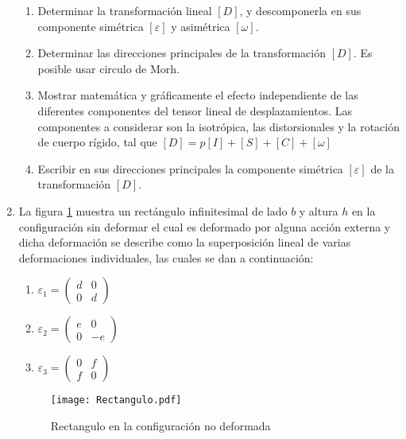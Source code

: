 \documentclass[../notas medios.tex]{subfiles}
\begin{document}
\begin{enumerate}
\begin{enumerate}
\item Determinar la transformación lineal $[D]$, y descomponerla en sus componente simétrica $[\varepsilon]$ y asimétrica $[\omega]$.
\item Determinar las direcciones principales de la transformación $[D]$. Es posible usar circulo de Morh.
\item Mostrar matemática y gráficamente el efecto independiente de las diferentes componentes del tensor lineal de desplazamientos. Las componentes a considerar son la isotrópica, las distorsionales y la rotación de cuerpo rígido, tal que $[D] = p[I] + [S] +[C] + [\omega]$
\item Escribir en sus direcciones principales la componente simétrica $[\varepsilon]$ de la transformación $[D]$.
\end{enumerate}

\newpage
\item  \label{punto03_d} La figura \cref{Rectangulo} muestra un rectángulo infinitesimal de lado $b$ y altura $h$ en la configuraci\'on sin deformar el cual es deformado por alguna acci\'on externa y dicha deformaci\'on se describe como la superposici\'on lineal de varias deformaciones individuales, las cuales se dan a continuaci\'on: 

\begin{enumerate}
	\item $ {\varepsilon_1}=\left(\begin{array}{ccc}
d & 0 \\ 
0 & d 
\end{array}\right) \enspace $\\
	\item $ {\varepsilon_2}=\left(\begin{array}{ccc}
e & 0 \\ 
0 & -e 
\end{array}\right) \enspace $\\
	\item ${\varepsilon_3}=\left(\begin{array}{ccc}
0 & f \\ 
f & 0 
\end{array}\right) \enspace $\\
\end{enumerate}
	
	\begin{figure}[H]		
		\centering	
		\texttt{[image: Rectangulo.pdf]}
		\caption{Rectangulo en la configuraci\'on no deformada}
		\label{Rectangulo}
	\end{figure}


\end{enumerate}
\end{document}
